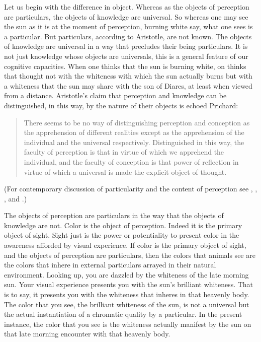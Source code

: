 Let us begin with the difference in object. Whereas as the objects of perception are particulars, the objects of knowledge are universal. So whereas one may see the sun as it is at the moment of perception, burning white say, what one sees is a particular. But particulars, according to Aristotle, are not known. The objects of knowledge are universal in a way that precludes their being particulars. It is not just knowledge whose objects are universals, this is a general feature of our cognitive capacities. When one thinks that the sun is burning white, on thinks that thought not with the whiteness with which the sun actually burns but with a whiteness that the sun may share with the son of Diares, at least when viewed from a distance. Aristotle's claim that perception and knowledge can be distinguished, in this way, by the nature of their objects is echoed Prichard:
% 	
\begin{quote}
	There seems to be no way of distinguishing perception and conception as the apprehension of different realities except as the apprehension of the individual and the universal respectively. Distinguished in this way, the faculty of perception is that in virtue of which we apprehend the individual, and the faculty of conception is that power of reflection in virtue of which a universal is made the explicit object of thought. \citep[]{Prichard:1909yg}
\end{quote}
(For contemporary discussion of particularity and the content of perception see \citealt{Brewer:2008fk}, \citealt{Martin:2002jb}, \citealt{Soteriou:2000iz,Soteriou:2005fk}, and \citealt{Travis:2005ys}.)

The objects of perception are particulars in the way that the objects of knowledge are not. Color is the object of perception. Indeed it is the primary object of sight. Sight just is the power or potentiality to present color in the awareness afforded by visual experience. If color is the primary object of sight, and the objects of perception are particulars, then the colors that animals see are the colors that inhere in external particulars arrayed in their natural environment. Looking up, you are dazzled by the whiteness of the late morning sun. Your visual experience presents you with the sun's brilliant whiteness. That is to say, it presents you with the whiteness that inheres in that heavenly body. The color that you see, the brilliant whiteness of the sun, is not a universal but the actual instantiation of a chromatic quality by a particular. In the present instance, the color that you see is the whiteness actually manifest by the sun on that late morning encounter with that heavenly body.

